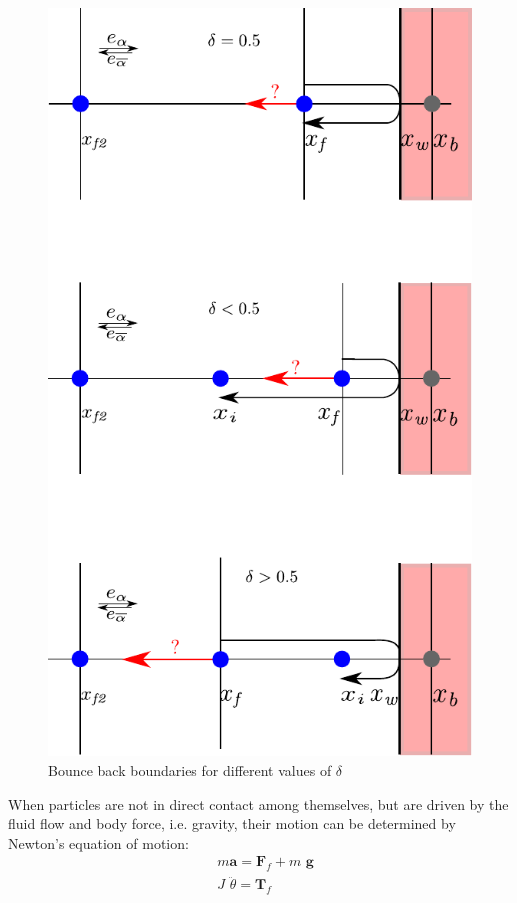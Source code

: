 \begin{figure}[htbp]
\centering
\includegraphics[scale=1]{Chapter3/figures/lbm/bouncemod.pdf}
\caption{Bounce back boundaries for different values of $\delta$}
\label{fig:bouncemod}
\end{figure}
When particles are not in direct contact among themselves, but are driven by the fluid flow and body force, i.e. gravity, their motion can be determined by Newton's equation of motion:
\begin{align}
& \textit{m}\mathbf{ a}=\mathbf{F}_{f} + \textit{m }\mathbf{g} \\
& \textit{J } \ddot{\theta} =  \mathbf{T}_{f}
\end{align}
